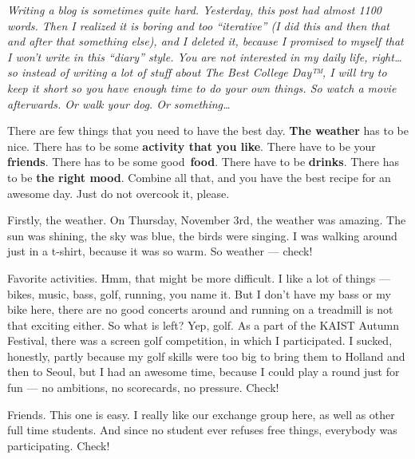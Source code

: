 \begin{post}
	\begin{content}
\textit{Writing a blog is sometimes quite hard. Yesterday, this post had almost 1100 words. Then I realized it is boring and too ``iterative'' (I did this and then that and after that something else), and I deleted it, because I promised to myself that I won't write in this ``diary'' style. You are not interested in my daily life, right{\ldots}so instead of writing a lot of stuff about The Best College Day™, I will try to keep it short so you have enough time to do your own things. So watch a movie afterwards. Or walk your dog. Or something{\ldots}}

There are few things that you need to have the best day. \textbf{The weather} has to be nice. There has to be some \textbf{activity that you like}. There have to be your \textbf{friends}. There has to be some good \textbf{food}. There have to be \textbf{drinks}. There has to be\textbf{ the right mood}. Combine all that, and you have the best recipe for an awesome day. Just do not overcook it, please.

Firstly, the weather. On Thursday, November 3rd, the weather was amazing. The sun was shining, the sky was blue, the birds were singing. I was walking around just in a t-shirt, because it was so warm. So weather --- \textcolor{Chameleon}{check!}

Favorite activities. Hmm, that might be more difficult. I like a lot of things --- bikes, music, bass, golf, running, you name it. But I don't have my bass or my bike here, there are no good concerts around and running on a treadmill is not that exciting either. So what is left? Yep, golf. As a part of the KAIST Autumn Festival, there was a screen golf competition, in which I participated. I sucked, honestly, partly because my golf skills were too big to bring them to Holland and then to Seoul, but I had an awesome time, because I could play a round just for fun --- no ambitions, no scorecards, no pressure. \textcolor{Chameleon}{Check!}

Friends. This one is easy. I really like our exchange group here, as well as other full time students. And since no student ever refuses free things, everybody was participating. \textcolor{Chameleon}{Check!}

\begin{figure}
\centering{}\vspace{-32pt}
\end{figure}



\end{content}
\end{post}
